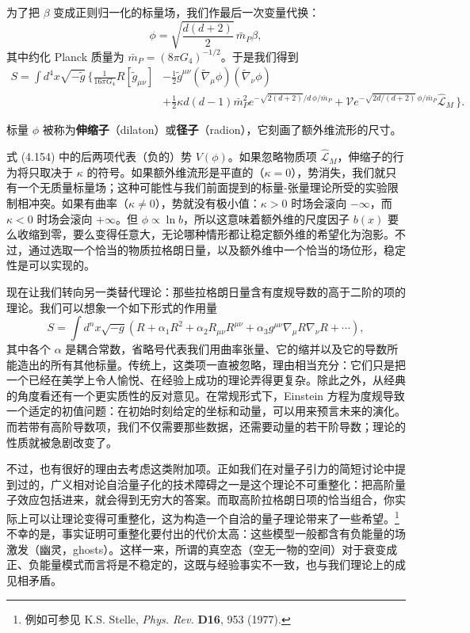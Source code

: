 为了把 $\beta$ 变成正则归一化的标量场，我们作最后一次变量代换：
\begin{equation*}
\phi = \sqrt{\frac{d(d+2)}{2}}\,\bar{m}_P\beta,
\tag{4.153}
\end{equation*}
其中约化 Planck 质量为 $\bar{m}_P=(8\pi G_{4})^{-1/2}$。于是我们得到
\begin{align*}
S = \int d^{4}x\sqrt{-\tilde{g}}\,\bigg\{ \frac{1}{16\pi G_{4}}R[\tilde{g}_{\mu\nu}] &- \frac{1}{2}\tilde{g}^{\mu\nu}(\widetilde{\nabla}_{\mu}\phi)(\widetilde{\nabla}_{\nu}\phi)\\
&+ \frac{1}{2}\kappa d(d-1)\bar{m}_P^{2}e^{-\sqrt{2(d+2)}/d\,\phi/\bar{m}_P} + \mathcal{V}e^{-\sqrt{2d/(d+2)}\,\phi/\bar{m}_P}\widehat{\mathcal{L}}_M\,\bigg\}.
\tag{4.154}
\end{align*}

标量 $\phi$ 被称为\textbf{伸缩子}（dilaton）或\textbf{径子}（radion），它刻画了额外维流形的尺寸。

式 (4.154) 中的后两项代表（负的）势 $V(\phi)$。如果忽略物质项 $\widehat{\mathcal{L}}_M$，伸缩子的行为将只取决于 $\kappa$ 的符号。如果额外维流形是平直的（$\kappa=0$），势消失，我们就只有一个无质量标量场；这种可能性与我们前面提到的标量-张量理论所受的实验限制相冲突。如果有曲率（$\kappa\neq 0$），势就没有极小值：$\kappa>0$ 时场会滚向 $-\infty$，而 $\kappa<0$ 时场会滚向 $+\infty$。但 $\phi\propto\ln b$，所以这意味着额外维的尺度因子 $b(x)$ 要么收缩到零，要么变得任意大，无论哪种情形都让稳定额外维的希望化为泡影。不过，通过选取一个恰当的物质拉格朗日量，以及额外维中一个恰当的场位形，稳定性是可以实现的。

现在让我们转向另一类替代理论：那些拉格朗日量含有度规导数的高于二阶的项的理论。我们可以想象一个如下形式的作用量
\begin{equation*}
S = \int d^{n}x\sqrt{-g}\left(R + \alpha_{1}R^{2} + \alpha_{2}R_{\mu\nu}R^{\mu\nu} + \alpha_{3}g^{\mu\nu}\nabla_{\mu}R\nabla_{\nu}R + \cdots\right),
\tag{4.155}
\end{equation*}
其中各个 $\alpha$ 是耦合常数，省略号代表我们用曲率张量、它的缩并以及它的导数所能造出的所有其他标量。传统上，这类项一直被忽略，理由相当充分：它们只是把一个已经在美学上令人愉悦、在经验上成功的理论弄得更复杂。除此之外，从经典的角度看还有一个更实质性的反对意见。在常规形式下，Einstein 方程为度规导致一个适定的初值问题：在初始时刻给定的坐标和动量，可以用来预言未来的演化。而若带有高阶导数项，我们不仅需要那些数据，还需要动量的若干阶导数；理论的性质就被急剧改变了。

不过，也有很好的理由去考虑这类附加项。正如我们在对量子引力的简短讨论中提到过的，广义相对论自洽量子化的技术障碍之一是这个理论不可重整化：把高阶量子效应包括进来，就会得到无穷大的答案。而取高阶拉格朗日项的恰当组合，你实际上可以让理论变得可重整化，这为构造一个自洽的量子理论带来了一些希望。\footnote{例如可参见 K.S. Stelle, \emph{Phys. Rev.} \textbf{D16}, 953 (1977).}不幸的是，事实证明可重整化要付出的代价太高：这些模型一般都含有负能量的场激发（幽灵，ghosts）。这样一来，所谓的真空态（空无一物的空间）对于衰变成正、负能量模式而言将是不稳定的，这既与经验事实不一致，也与我们理论上的成见相矛盾。

